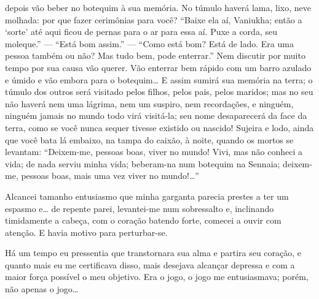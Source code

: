 depois vão beber no botequim à sua memória. No túmulo haverá lama,
lixo, neve molhada: por que fazer cerimônias para você? “Baixe ela aí,
Vaniukha; então a ‘sorte’ até aqui ficou de pernas para o ar para essa
aí. Puxe a corda, seu moleque.” --- “Está bom assim.” --- “Como está bom?
Está de lado. Era uma pessoa também ou não? Mas tudo bem, pode
enterrar.” Nem discutir por muito tempo por sua causa vão querer. Vão
enterrar bem rápido com um barro azulado e úmido e vão embora para o
botequim\ldots{} E assim sumirá sua memória na terra; o túmulo dos outros
será visitado pelos filhos, pelos pais, pelos maridos; mas no seu não
haverá nem uma lágrima, nem um suspiro, nem recordações, e ninguém,
ninguém jamais no mundo todo virá visitá-la; seu nome desaparecerá da
face da terra, como se você nunca sequer tivesse existido ou nascido!
Sujeira e lodo, ainda que você bata lá embaixo, na tampa do caixão, à
noite, quando os mortos se levantam: “Deixem-me, pessoas boas, viver no
mundo! Vivi, mas não conheci a vida; de nada serviu minha vida;
beberam-na num botequim na Sennaia; deixem-me, pessoas boas, mais uma
vez viver no mundo!\ldots{}”

Alcancei tamanho entusiasmo que minha garganta parecia prestes a ter um
espasmo e\ldots{} de repente parei, levantei-me num sobressalto e,
inclinando timidamente a cabeça, com o coração batendo forte, comecei a
ouvir com atenção. E havia motivo para perturbar-se.

Há um tempo eu pressentia que transtornara sua alma e partira seu
coração, e quanto mais eu me certificava disso, mais desejava alcançar
depressa e com a maior força possível o meu objetivo. Era o jogo, o
jogo me entusiasmava; porém, não apenas o jogo\ldots{}

